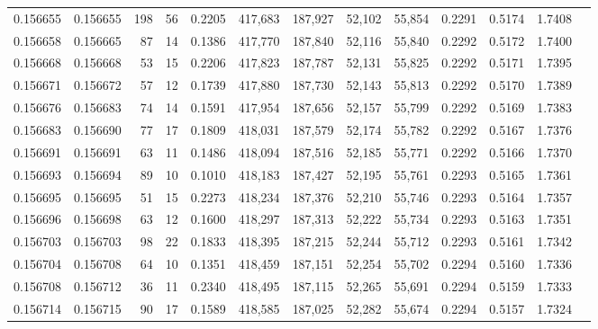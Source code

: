 \begin{tabular}{rrrrrrrrrrrrr}
0.156655 & 0.156655 &   198 &  56 &                                     0.2205 & 417,683 & 187,927 &  52,102 &  55,854 & 0.2291 & 0.5174 & 1.7408 \\
0.156658 & 0.156665 &    87 &  14 &                                     0.1386 & 417,770 & 187,840 &  52,116 &  55,840 & 0.2292 & 0.5172 & 1.7400 \\
0.156668 & 0.156668 &    53 &  15 &                                     0.2206 & 417,823 & 187,787 &  52,131 &  55,825 & 0.2292 & 0.5171 & 1.7395 \\
0.156671 & 0.156672 &    57 &  12 &                                     0.1739 & 417,880 & 187,730 &  52,143 &  55,813 & 0.2292 & 0.5170 & 1.7389 \\
0.156676 & 0.156683 &    74 &  14 &                                     0.1591 & 417,954 & 187,656 &  52,157 &  55,799 & 0.2292 & 0.5169 & 1.7383 \\
0.156683 & 0.156690 &    77 &  17 &                                     0.1809 & 418,031 & 187,579 &  52,174 &  55,782 & 0.2292 & 0.5167 & 1.7376 \\
0.156691 & 0.156691 &    63 &  11 &                                     0.1486 & 418,094 & 187,516 &  52,185 &  55,771 & 0.2292 & 0.5166 & 1.7370 \\
0.156693 & 0.156694 &    89 &  10 &                                     0.1010 & 418,183 & 187,427 &  52,195 &  55,761 & 0.2293 & 0.5165 & 1.7361 \\
0.156695 & 0.156695 &    51 &  15 &                                     0.2273 & 418,234 & 187,376 &  52,210 &  55,746 & 0.2293 & 0.5164 & 1.7357 \\
0.156696 & 0.156698 &    63 &  12 &                                     0.1600 & 418,297 & 187,313 &  52,222 &  55,734 & 0.2293 & 0.5163 & 1.7351 \\
0.156703 & 0.156703 &    98 &  22 &                                     0.1833 & 418,395 & 187,215 &  52,244 &  55,712 & 0.2293 & 0.5161 & 1.7342 \\
0.156704 & 0.156708 &    64 &  10 &                                     0.1351 & 418,459 & 187,151 &  52,254 &  55,702 & 0.2294 & 0.5160 & 1.7336 \\
0.156708 & 0.156712 &    36 &  11 &                                     0.2340 & 418,495 & 187,115 &  52,265 &  55,691 & 0.2294 & 0.5159 & 1.7333 \\
0.156714 & 0.156715 &    90 &  17 &                                     0.1589 & 418,585 & 187,025 &  52,282 &  55,674 & 0.2294 & 0.5157 & 1.7324 \\

\end{tabular}
